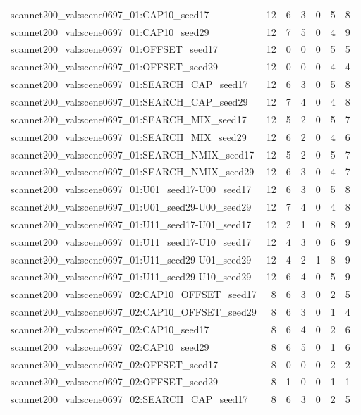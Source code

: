 \begin{table}[t]
\begin{tabular}{lrrrrrr}
scannet200\_val:scene0697\_01:CAP10\_seed17 & 12 & 6 & 3 & 0 & 5 & 8 \\
scannet200\_val:scene0697\_01:CAP10\_seed29 & 12 & 7 & 5 & 0 & 4 & 9 \\
scannet200\_val:scene0697\_01:OFFSET\_seed17 & 12 & 0 & 0 & 0 & 5 & 5 \\
scannet200\_val:scene0697\_01:OFFSET\_seed29 & 12 & 0 & 0 & 0 & 4 & 4 \\
scannet200\_val:scene0697\_01:SEARCH\_CAP\_seed17 & 12 & 6 & 3 & 0 & 5 & 8 \\
scannet200\_val:scene0697\_01:SEARCH\_CAP\_seed29 & 12 & 7 & 4 & 0 & 4 & 8 \\
scannet200\_val:scene0697\_01:SEARCH\_MIX\_seed17 & 12 & 5 & 2 & 0 & 5 & 7 \\
scannet200\_val:scene0697\_01:SEARCH\_MIX\_seed29 & 12 & 6 & 2 & 0 & 4 & 6 \\
scannet200\_val:scene0697\_01:SEARCH\_NMIX\_seed17 & 12 & 5 & 2 & 0 & 5 & 7 \\
scannet200\_val:scene0697\_01:SEARCH\_NMIX\_seed29 & 12 & 6 & 3 & 0 & 4 & 7 \\
scannet200\_val:scene0697\_01:U01\_seed17-U00\_seed17 & 12 & 6 & 3 & 0 & 5 & 8 \\
scannet200\_val:scene0697\_01:U01\_seed29-U00\_seed29 & 12 & 7 & 4 & 0 & 4 & 8 \\
scannet200\_val:scene0697\_01:U11\_seed17-U01\_seed17 & 12 & 2 & 1 & 0 & 8 & 9 \\
scannet200\_val:scene0697\_01:U11\_seed17-U10\_seed17 & 12 & 4 & 3 & 0 & 6 & 9 \\
scannet200\_val:scene0697\_01:U11\_seed29-U01\_seed29 & 12 & 4 & 2 & 1 & 8 & 9 \\
scannet200\_val:scene0697\_01:U11\_seed29-U10\_seed29 & 12 & 6 & 4 & 0 & 5 & 9 \\
scannet200\_val:scene0697\_02:CAP10\_OFFSET\_seed17 & 8 & 6 & 3 & 0 & 2 & 5 \\
scannet200\_val:scene0697\_02:CAP10\_OFFSET\_seed29 & 8 & 6 & 3 & 0 & 1 & 4 \\
scannet200\_val:scene0697\_02:CAP10\_seed17 & 8 & 6 & 4 & 0 & 2 & 6 \\
scannet200\_val:scene0697\_02:CAP10\_seed29 & 8 & 6 & 5 & 0 & 1 & 6 \\
scannet200\_val:scene0697\_02:OFFSET\_seed17 & 8 & 0 & 0 & 0 & 2 & 2 \\
scannet200\_val:scene0697\_02:OFFSET\_seed29 & 8 & 1 & 0 & 0 & 1 & 1 \\
scannet200\_val:scene0697\_02:SEARCH\_CAP\_seed17 & 8 & 6 & 3 & 0 & 2 & 5 \\

\end{tabular}
\end{table}
